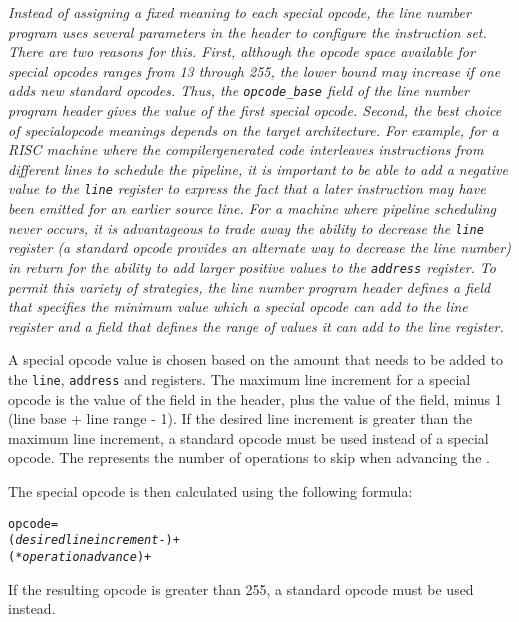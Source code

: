 \textit{Instead of assigning a fixed meaning to each special opcode,
the line number program uses several parameters in the header
to configure the instruction set. There are two reasons
for this.  First, although the opcode space available for
special opcodes ranges from 13 through 255, the lower
bound may increase if one adds new standard opcodes. Thus, the
\texttt{opcode\_base} field of the line number program header gives the
value of the first special opcode. Second, the best choice of
special\dash opcode meanings depends on the target architecture. For
example, for a RISC machine where the compiler\dash generated code
interleaves instructions from different lines to schedule
the pipeline, it is important to be able to add a negative
value to the \texttt{line} register to express the fact that a later
instruction may have been emitted for an earlier source
line. For a machine where pipeline scheduling never occurs,
it is advantageous to trade away the ability to decrease
the \texttt{line} register (a standard opcode provides an alternate
way to decrease the line number) in return for the ability
to add larger positive values to the \texttt{address} register. To
permit this variety of strategies, the line number program
header defines a 
field that specifies the minimum
value which a special opcode can add to the line register
and a 
field that defines the range of values it
can add to the line register.}


A special opcode value is chosen based on the amount that needs
to be added to the \texttt{line}, \texttt{address} and  registers.
The maximum line increment for a special opcode is the value
of the 
field in the header, plus the value of the 
 field, minus 1 (line base + 
line range - 1). 
If the desired line increment is greater than the maximum
line increment, a standard opcode must be used instead of a
special opcode. The  represents the number
of operations to skip when advancing the .

The special opcode is then calculated using the following formula:
\begin{alltt}
  opcode = 
    (\textit{desired line increment} - ) +
      ( * \textit{operation advance}) + 
\end{alltt}
If the resulting opcode is greater than 255, a standard opcode
must be used instead.

